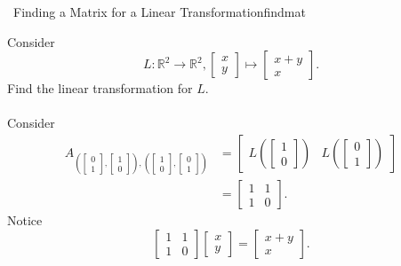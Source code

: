         \begin{example}{\Difficulty\,\Difficulty\,\,Finding a Matrix for a Linear Transformation}{findmat}
            
            Consider
            \begin{equation*}
                L:\mathbb{R}^2\to\mathbb{R}^2, \begin{bmatrix} x \\ y \end{bmatrix} \mapsto \begin{bmatrix} x+y \\ x \end{bmatrix}.
            \end{equation*}
            Find the linear transformation for \(L\).
            \\
            \\
            Consider
            \begin{align*}
                A_{\left(\begin{bmatrix} 0 \\ 1 \end{bmatrix}, \begin{bmatrix} 1 \\ 0 \end{bmatrix}\right),\left(\begin{bmatrix} 1 \\ 0 \end{bmatrix},\begin{bmatrix} 0 \\ 1 \end{bmatrix}\right)}&=\begin{bmatrix} L\left(\begin{bmatrix} 1 \\ 0 \end{bmatrix}\right) & L\left(\begin{bmatrix} 0 \\ 1 \end{bmatrix}\right) \end{bmatrix} \\
                &=\begin{bmatrix}
                    1 & 1 \\
                    1 & 0
                \end{bmatrix}.
            \end{align*}
            Notice
            \begin{equation*}
                \begin{bmatrix}
                    1 & 1 \\
                    1 & 0
                \end{bmatrix}\begin{bmatrix} x \\ y \end{bmatrix}=\begin{bmatrix} x+y \\ x \end{bmatrix}.
            \end{equation*}
        \end{example}
